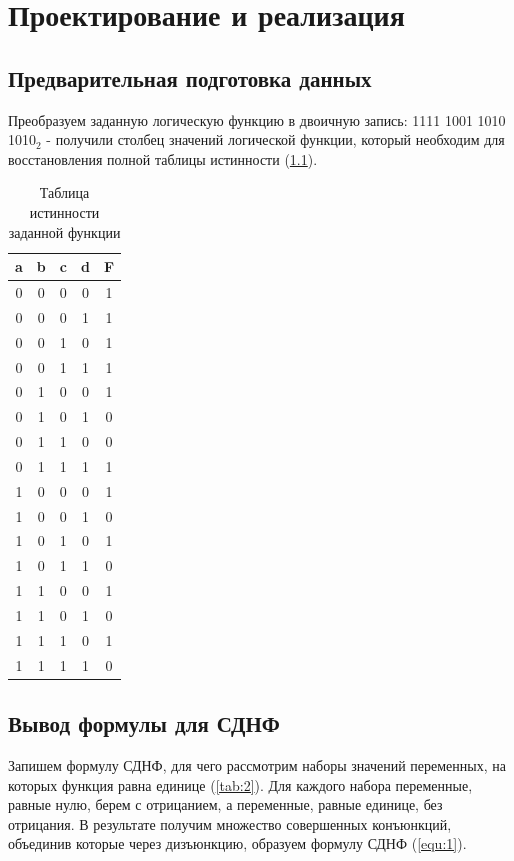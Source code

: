 \documentclass[14pt, a4paper]{extreport}
\begin{document}
\chapter{Проектирование и реализация}
\section{Предварительная подготовка данных}
Преобразуем заданную логическую функцию в двоичную запись: 1111 1001 1010 1010$_2$ - получили столбец значений логической функции, который необходим для восстановления полной таблицы истинности (\cref{tab:1}).

\begin{table}[!htbp]
	\caption{Таблица истинности заданной функции}
	\label{tab:1}
	\begin{tabular}{|c|c|c|c|c|}
		\hline
		a & b & c & d & F \\
		\hline
		0 & 0 & 0 & 0 & 1 \\
		\hline
		0 & 0 & 0 & 1 & 1 \\
		\hline
		0 & 0 & 1 & 0 & 1 \\
		\hline
		0 & 0 & 1 & 1 & 1 \\
		\hline
		0 & 1 & 0 & 0 & 1 \\
		\hline
		0 & 1 & 0 & 1 & 0 \\
		\hline
		0 & 1 & 1 & 0 & 0 \\
		\hline
		0 & 1 & 1 & 1 & 1 \\
		\hline
		1 & 0 & 0 & 0 & 1 \\
		\hline
		1 & 0 & 0 & 1 & 0 \\
		\hline
		1 & 0 & 1 & 0 & 1 \\
		\hline
		1 & 0 & 1 & 1 & 0 \\
		\hline
		1 & 1 & 0 & 0 & 1 \\
		\hline
		1 & 1 & 0 & 1 & 0 \\
		\hline
		1 & 1 & 1 & 0 & 1 \\
		\hline
		1 & 1 & 1 & 1 & 0 \\
		\hline
	\end{tabular}
\end{table}

\section{Вывод формулы для СДНФ}
Запишем формулу СДНФ, для чего рассмотрим наборы значений переменных, на которых функция равна единице (\cref{tab:2}). Для каждого набора переменные, равные нулю, берем с отрицанием, а переменные, равные единице, без отрицания. В результате получим множество совершенных конъюнкций, объединив которые через дизъюнкцию, образуем формулу СДНФ (\cref{equ:1}).
\end{document}
